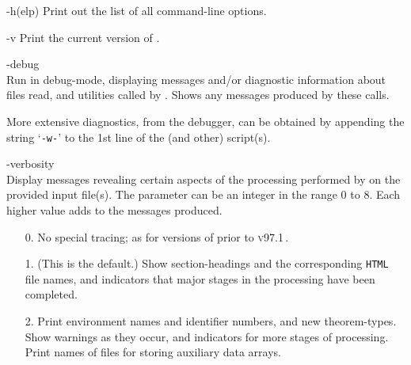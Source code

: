 \begin{htmllist}%
%
%
\item [ -h(elp)\label{optionlist}]
Print out the list of all command-line options.

%
\begin{changebar}
\item [ -v\label{showversion}]
Print the current version of \latextohtml.
\end{changebar}%

%
\begin{changebar}
\item [ -debug\label{debugmode}]
\\
Run in debug-mode, displaying messages and/or diagnostic information
about files read, and utilities called by \latextohtml.
Shows any messages produced by these calls.%

%

More extensive diagnostics, from the \Perl{} debugger,
can be obtained by appending the string `\texttt{-w-}'
to the 1st line of the  (and other) \Perl{} script(s).
\end{changebar}


%
\begin{changebar}
\item [ -verbosity \Meta{num}\label{verbositylevel}]
\\
Display messages revealing certain aspects of the processing
performed by \latextohtml{} on the provided input file(s).
The  parameter can be an integer in the range 0 to 8.
Each higher value adds to the messages produced.

\begin{itemize}
\item[0. ]
No special tracing; as for versions of \latextohtml{} prior to \textsc{v97.1}\,.

\item[1. ] (This is the default.)
Show section-headings and the corresponding \texttt{HTML} file names,
and indicators that major stages in the processing have been completed.

\item[2. ]
Print environment names and identifier numbers, and new theorem-types.
Show warnings as they occur, and indicators for more stages of processing.
Print names of files for storing auxiliary data arrays.


\end{itemize}
\end{changebar}
\end{htmllist}
